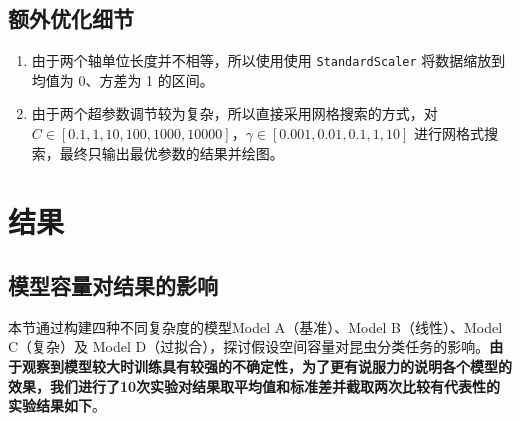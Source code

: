 \subsection{额外优化细节}
\begin{enumerate}
	\item 由于两个轴单位长度并不相等，所以使用使用 \texttt{StandardScaler} 将数据缩放到均值为 0、方差为 1 的区间。
	
	\item 由于两个超参数调节较为复杂，所以直接采用网格搜索的方式，对$C \in [0.1, 1, 10, 100, 1000, 10000]$，$ \gamma \in [0.001, 0.01, 0.1, 1, 10]$ 进行网格式搜索，最终只输出最优参数的结果并绘图。
\end{enumerate}

	
\section{结果}

\subsection{模型容量对结果的影响}

本节通过构建四种不同复杂度的模型Model A（基准）、Model B（线性）、Model C（复杂）及 Model D（过拟合），探讨假设空间容量对昆虫分类任务的影响。\textbf{由于观察到模型较大时训练具有较强的不确定性，为了更有说服力的说明各个模型的效果，我们进行了10次实验对结果取平均值和标准差并截取两次比较有代表性的实验结果如下}。


